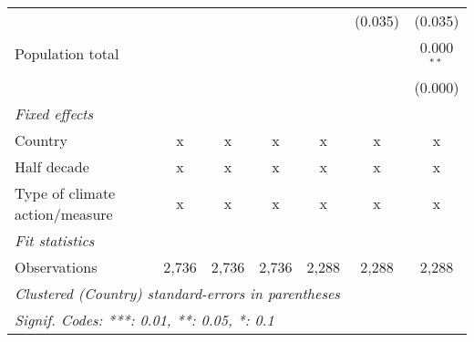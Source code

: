 \begin{tabular}{lcccccc}
                                                &               &               &               &               & (0.035)       & (0.035)\\   
   Population total                             &               &               &               &               &               & 0.000$^{**}$\\   
                                                &               &               &               &               &               & (0.000)\\   
   \emph{Fixed effects}\\
   Country                                      & x             & x             & x             & x             & x             & x\\  
   Half decade                                  & x             & x             & x             & x             & x             & x\\  
   Type of climate action/measure               & x             & x             & x             & x             & x             & x\\  
   \midrule \emph{Fit statistics}\\
   Observations                                 & 2,736         & 2,736         & 2,736         & 2,288         & 2,288         & 2,288\\  
   \midrule
   \multicolumn{7}{l}{\emph{Clustered (Country) standard-errors in parentheses}}\\
   \multicolumn{7}{l}{\emph{Signif. Codes: ***: 0.01, **: 0.05, *: 0.1}}\\
\end{tabular}
\par\endgroup


